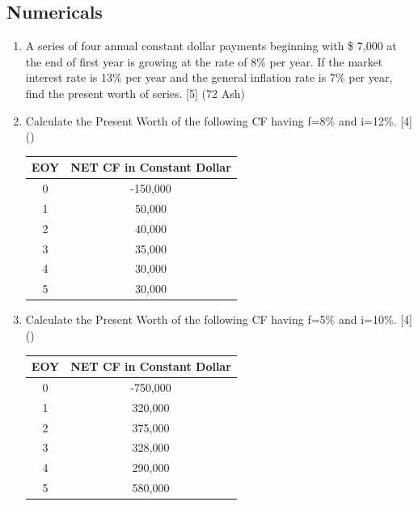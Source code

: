 \documentclass[12pt]{article}
\begin{document}
	\subsection{Numericals}
		\begin{enumerate}
			\item A series of four annual constant dollar payments beginning with \$ 7,000 at the end of first year is growing at the rate of 8\% per year. If the market interest rate is 13\% per year and the general inflation rate is 7\% per year, find the present worth of series. \hfill [5] (72 Ash)

			\item Calculate the Present Worth of the following CF having f=8\% and i=12\%. \hfill [4] ()
			\begin{tabular}{|c|c|}
				\hline
				EOY & NET CF in Constant Dollar \\ \hline
				0 & -150,000 \\ \hline
				1 & 50,000 \\ \hline
				2 & 40,000 \\ \hline
				3 & 35,000 \\ \hline
				4 & 30,000 \\ \hline
				5 & 30,000 \\ \hline
			\end{tabular}

			\item Calculate the Present Worth of the following CF having f=5\% and i=10\%. \hfill [4] ()
			\begin{tabular}{|c|c|}
				\hline
				EOY & NET CF in Constant Dollar \\ \hline
				0 & -750,000 \\ \hline
				1 & 320,000 \\ \hline
				2 & 375,000 \\ \hline
				3 & 328,000 \\ \hline
				4 & 290,000 \\ \hline
				5 & 580,000 \\ \hline
			\end{tabular}


\end{enumerate}
\end{document}
